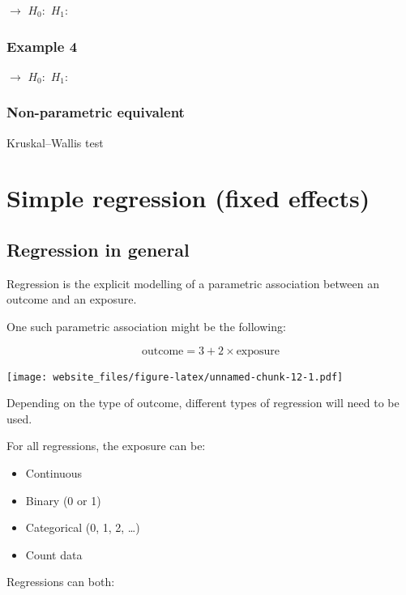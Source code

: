 \documentclass[12pt,]{article}
\providecommand{\tightlist}{%
  \setlength{\itemsep}{0pt}\setlength{\parskip}{0pt}}
\begin{document}
\(\rightarrow\) \hfill \break
\hfill \break
\hfill \break
\(H_0:\) \hfill \break
\hfill \break
\hfill \break
\(H_1:\)

\newpage

\subsubsection{Example 4}\label{example-4-3}

\(\rightarrow\) \hfill \break
\hfill \break
\hfill \break
\(H_0:\) \hfill \break
\hfill \break
\hfill \break
\(H_1:\)

\subsubsection{Non-parametric
equivalent}\label{non-parametric-equivalent-2}

Kruskal--Wallis test

\section{Simple regression (fixed
effects)}\label{simple-regression-fixed-effects}

\subsection{Regression in general}\label{regression-in-general}

Regression is the explicit modelling of a parametric association between
an outcome and an exposure.

One such parametric association might be the following:

\[\text{outcome} = 3 + 2 \times \text{exposure}\]

\texttt{[image: website\_files/figure-latex/unnamed-chunk-12-1.pdf]}

Depending on the type of outcome, different types of regression will
need to be used.

For all regressions, the exposure can be:

\begin{itemize}
\tightlist
\item
  Continuous
\item
  Binary (0 or 1)
\item
  Categorical (0, 1, 2, \ldots{})
\item
  Count data
\end{itemize}

Regressions can both:
\end{document}
